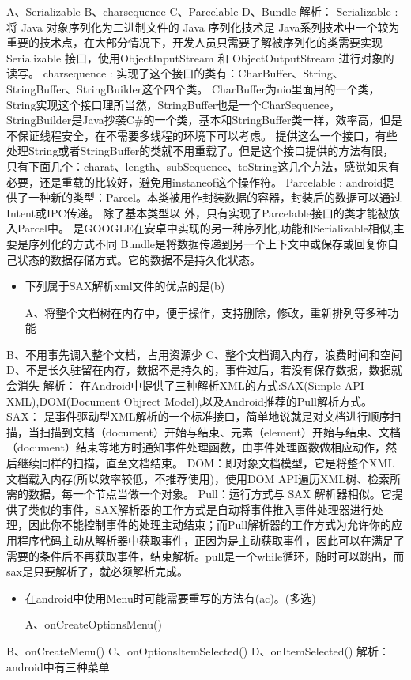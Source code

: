 \documentclass[9pt, b5paper]{article}
\begin{document}
 A、Serializable B、charsequence C、Parcelable D、Bundle
    解析：
    Serializable :将 Java 对象序列化为二进制文件的 Java 序列化技术是 Java系列技术中一个较为重要的技术点，在大部分情况下，开发人员只需要了解被序列化的类需要实现 Serializable 接口，使用ObjectInputStream 和 ObjectOutputStream 进行对象的读写。
    charsequence  :
实现了这个接口的类有：CharBuffer、String、StringBuffer、StringBuilder这个四个类。
    CharBuffer为nio里面用的一个类，String实现这个接口理所当然，StringBuffer也是一个CharSequence，StringBuilder是Java抄袭C\#的一个类，基本和StringBuffer类一样，效率高，但是不保证线程安全，在不需要多线程的环境下可以考虑。
    提供这么一个接口，有些处理String或者StringBuffer的类就不用重载了。但是这个接口提供的方法有限，只有下面几个：charat、length、subSequence、toString这几个方法，感觉如果有必要，还是重载的比较好，避免用instaneof这个操作符。
    Parcelable  :
android提供了一种新的类型：Parcel。本类被用作封装数据的容器，封装后的数据可以通过Intent或IPC传递。 除了基本类型以
外，只有实现了Parcelable接口的类才能被放入Parcel中。
是GOOGLE在安卓中实现的另一种序列化,功能和Serializable相似,主要是序列化的方式不同
    Bundle是将数据传递到另一个上下文中或保存或回复你自己状态的数据存储方式。它的数据不是持久化状态。
\begin{itemize}
\item 下列属于SAX解析xml文件的优点的是(b)

A、将整个文档树在内存中，便于操作，支持删除，修改，重新排列等多种功能
\end{itemize}
B、不用事先调入整个文档，占用资源少
C、整个文档调入内存，浪费时间和空间
D、不是长久驻留在内存，数据不是持久的，事件过后，若没有保存数据，数据就会消失
解析：
    在Android中提供了三种解析XML的方式:SAX(Simple API XML),DOM(Document Objrect Model),以及Android推荐的Pull解析方式。
SAX： 是事件驱动型XML解析的一个标准接口，简单地说就是对文档进行顺序扫描，当扫描到文档（document）开始与结束、元素（element）开始与结束、文档（document）结束等地方时通知事件处理函数，由事件处理函数做相应动作，然后继续同样的扫描，直至文档结束。
DOM：即对象文档模型，它是将整个XML文档载入内存(所以效率较低，不推荐使用)，使用DOM API遍历XML树、检索所需的数据，每一个节点当做一个对象。
Pull：运行方式与 SAX 解析器相似。它提供了类似的事件，SAX解析器的工作方式是自动将事件推入事件处理器进行处理，因此你不能控制事件的处理主动结束；而Pull解析器的工作方式为允许你的应用程序代码主动从解析器中获取事件，正因为是主动获取事件，因此可以在满足了需要的条件后不再获取事件，结束解析。pull是一个while循环，随时可以跳出，而sax是只要解析了，就必须解析完成。
\begin{itemize}
\item 在android中使用Menu时可能需要重写的方法有(ac)。(多选)

A、onCreateOptionsMenu()
\end{itemize}
B、onCreateMenu()
C、onOptionsItemSelected()
D、onItemSelected()
    解析：
    android中有三种菜单
\end{document}
